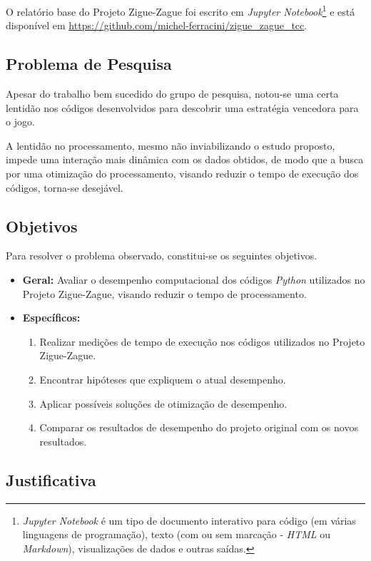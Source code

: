 \documentclass[12pt]{article}
\begin{document}
O relatório base do Projeto Zigue-Zague foi escrito em \textit{Jupyter Notebook}\footnote{\textit{Jupyter Notebook} é um tipo de documento interativo para código (em várias linguagens de programação), texto (com ou sem marcação - \textit{HTML} ou \textit{Markdown}), visualizações de dados e outras saídas.} e está disponível em \url{https://github.com/michel-ferracini/zigue_zague_tcc}.

\subsection{Problema de Pesquisa}
\label{problema_pesquisa}

Apesar do trabalho bem sucedido do grupo de pesquisa, notou-se uma certa lentidão nos códigos desenvolvidos para descobrir uma estratégia vencedora para o jogo.

A lentidão no processamento, mesmo não inviabilizando o estudo proposto, impede uma interação mais dinâmica com os dados obtidos, de modo que a busca por uma otimização do processamento, visando reduzir o tempo de execução dos códigos, torna-se desejável.

\subsection{Objetivos}
\label{objetivos}

Para resolver o problema observado, constitui-se os seguintes objetivos.


\begin{itemize}
	\item \textbf{Geral:} Avaliar o desempenho computacional dos códigos \textit{Python} utilizados no Projeto Zigue-Zague, visando reduzir o tempo de processamento.
	\item \textbf{Específicos:}
	\begin{enumerate}
		\item Realizar medições de tempo de execução nos códigos utilizados no Projeto Zigue-Zague.
		\item Encontrar hipóteses que expliquem o atual desempenho.
		\item Aplicar possíveis soluções de otimização de desempenho.
		\item Comparar os resultados de desempenho do projeto original com os novos resultados.
	\end{enumerate}
\end{itemize}

\subsection{Justificativa}
\label{justificativa}
\end{document}
